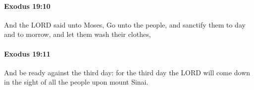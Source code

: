 		\paragraph{Exodus 19:10} %
			\label{EXODUS-19-10}

			And the LORD said unto Moses, Go unto the people, and sanctify them to day and to morrow, and let them wash their clothes,


		\paragraph{Exodus 19:11} %
			\label{EXODUS-19-11}

			And be ready against the third day: for the third day the LORD will come down in the sight of all the people upon mount Sinai.


